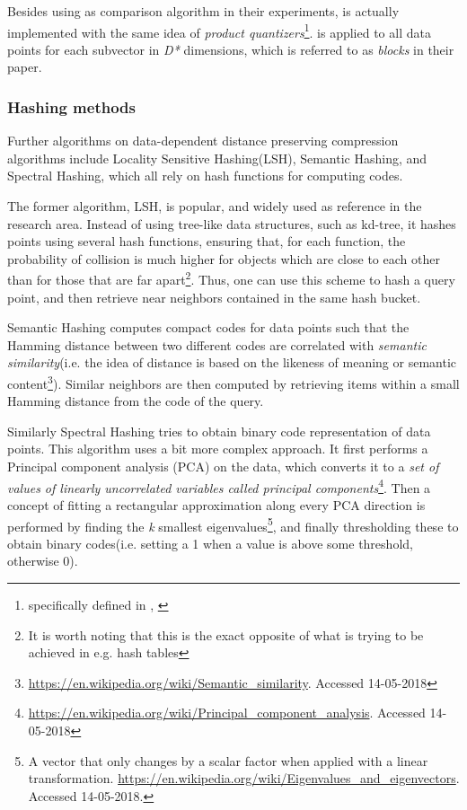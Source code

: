 Besides using \pq{} as comparison algorithm in their experiments, \qs{} is actually implemented with the same idea of \textit{product quantizers}\footnote{specifically defined in , \cite[p. 5]{wagner17}}. \qs{} is applied to all data points for each subvector in \textit{D*} dimensions, which is referred to as \textit{blocks} in their paper. 

\subsubsection{Hashing methods} %
Further algorithms on data-dependent distance preserving compression algorithms include Locality Sensitive Hashing(LSH), Semantic Hashing, and Spectral Hashing\cite{weiss8}, which all rely on hash functions for computing codes. 

The former algorithm, LSH, is popular, and widely used as reference in the research area. Instead of using tree-like data structures, such as kd-tree, it hashes points using several hash functions, ensuring that, for each function, the probability of collision is much higher for objects which are close to each other than for those that are far apart\footnote{It is worth noting that this is the exact opposite of what is trying to be achieved in e.g. hash tables}. Thus, one can use this scheme to hash a query point, and then retrieve near neighbors contained in the same hash bucket.

Semantic Hashing computes compact codes for data points such that the Hamming distance between two different codes are correlated with \textit{semantic similarity}(i.e. the idea of distance is based on the likeness of meaning or semantic content\footnote{\url{https://en.wikipedia.org/wiki/Semantic_similarity}. Accessed 14-05-2018}). Similar neighbors are then computed by retrieving items within a small Hamming distance from the code of the query.  

Similarly Spectral Hashing tries to obtain binary code representation of data points. This algorithm uses a bit more complex approach. It first performs a Principal component analysis (PCA) on the data, which converts it to a \textit{set of values of linearly uncorrelated variables called principal components}\footnote{\url{https://en.wikipedia.org/wiki/Principal_component_analysis}. Accessed 14-05-2018}. Then a concept of fitting a rectangular approximation along every PCA direction is performed by finding the \textit{k} smallest eigenvalues\footnote{A vector that only changes by a scalar factor when applied with a linear transformation. \url{https://en.wikipedia.org/wiki/Eigenvalues_and_eigenvectors}. Accessed 14-05-2018.}, and finally thresholding these to obtain binary codes(i.e. setting a 1 when a value is above some threshold, otherwise 0). 

